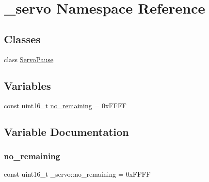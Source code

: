 \hypertarget{namespace__servo}{}\section{\+\_\+servo Namespace Reference}
\label{namespace__servo}
\subsection*{Classes}
\begin{DoxyCompactItemize}
\item 
class \hyperlink{class__servo_1_1ServoPause}{Servo\+Pause}
\end{DoxyCompactItemize}
\subsection*{Variables}
\begin{DoxyCompactItemize}
\item 
const uint16\+\_\+t \hyperlink{namespace__servo_aab767c7a03b53e909cc99a9e1df0e358}{no\+\_\+remaining} = 0x\+F\+F\+FF
\end{DoxyCompactItemize}


\subsection{Variable Documentation}
\hypertarget{namespace__servo_aab767c7a03b53e909cc99a9e1df0e358}{}\label{namespace__servo_aab767c7a03b53e909cc99a9e1df0e358} 
\subsubsection{\texorpdfstring{no\+\_\+remaining}{no\_remaining}}
{\footnotesize\ttfamily const uint16\+\_\+t \+\_\+servo\+::no\+\_\+remaining = 0x\+F\+F\+FF}

